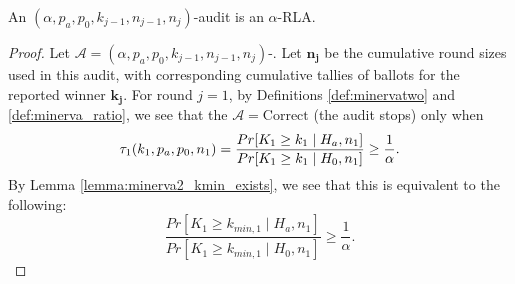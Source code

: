 \begin{theorem}
\label{thm:minerva2_is_rla_new}
An $(\alpha,p_a, p_0,k_{j-1},n_{j-1},n_j)$-\Providence audit is an
$\alpha$-RLA.
\end{theorem}
\begin{proof}
Let $\mathcal{A}=(\alpha,p_a, p_0,k_{j-1},n_{j-1},n_j)$-\Providence.
Let $\bm{n_j}$ be the cumulative round sizes used in this
audit, with corresponding cumulative tallies of
ballots for the reported winner $\bm{k_j}$.
For round $j=1$, by Definitions \ref{def:minervatwo}
and \ref{def:minerva_ratio}, we see that
the $\mathcal{A}=\text{Correct}$ (the audit stops) only when
$$
\tau_1(k_{1},p_a,p_0,n_1)\\
=\frac{Pr[K_{1} \geq k_{1} \mid H_a, n_1]}{Pr[K_{1} \geq k_{1} \mid H_0, n_1]}
\ge \frac{1}{\alpha}.
$$
By Lemma \ref{lemma:minerva2_kmin_exists}, we see that this
is equivalent to the following:
$$
\frac{Pr[K_{1} \geq k_{min,1} \mid H_a, n_1]}{Pr[K_{1} \geq k_{min, 1} \mid H_0, n_1]}
\ge \frac{1}{\alpha}.
$$


\end{proof}

